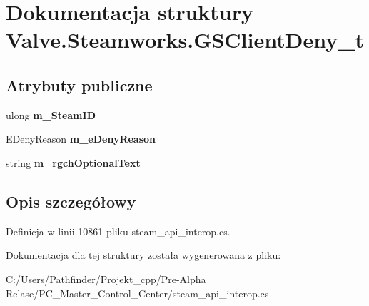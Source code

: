 \hypertarget{struct_valve_1_1_steamworks_1_1_g_s_client_deny__t}{}\section{Dokumentacja struktury Valve.\+Steamworks.\+G\+S\+Client\+Deny\+\_\+t}
\label{struct_valve_1_1_steamworks_1_1_g_s_client_deny__t}
\subsection*{Atrybuty publiczne}
\begin{DoxyCompactItemize}
\item 
\mbox{\label{struct_valve_1_1_steamworks_1_1_g_s_client_deny__t_a3cbe1b68a2ebba730c90cbbcf9e8a5b6}} 
ulong {\bfseries m\+\_\+\+Steam\+ID}
\item 
\mbox{\label{struct_valve_1_1_steamworks_1_1_g_s_client_deny__t_ab61de9a5ac4d05a2d6fac69b6c6a8111}} 
E\+Deny\+Reason {\bfseries m\+\_\+e\+Deny\+Reason}
\item 
\mbox{\label{struct_valve_1_1_steamworks_1_1_g_s_client_deny__t_a087f6f464383c0a8bc38df32065fcc97}} 
string {\bfseries m\+\_\+rgch\+Optional\+Text}
\end{DoxyCompactItemize}


\subsection{Opis szczegółowy}


Definicja w linii 10861 pliku steam\+\_\+api\+\_\+interop.\+cs.



Dokumentacja dla tej struktury została wygenerowana z pliku\+:\begin{DoxyCompactItemize}
\item 
C\+:/\+Users/\+Pathfinder/\+Projekt\+\_\+cpp/\+Pre-\/\+Alpha Relase/\+P\+C\+\_\+\+Master\+\_\+\+Control\+\_\+\+Center/steam\+\_\+api\+\_\+interop.\+cs\end{DoxyCompactItemize}

